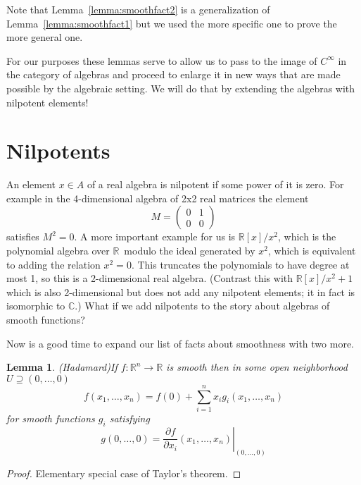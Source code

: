 \documentclass[12pt]{article}
\newcommand{\rr}{\ensuremath{\mathbb{R}}}
\newcommand{\cc}{\ensuremath{\mathbb{C}}}
\newcommand{\cinfty}{\ensuremath{C^{\infty}}}
\newtheorem{mylemma}{Lemma}
\begin{document}
Note that Lemma~\ref{lemma:smoothfact2} is a generalization of Lemma~\ref{lemma:smoothfact1} but we used the more specific one to prove the more general one.

For our purposes these lemmas serve to allow us to pass to the image of $\cinfty$ in the category of algebras and proceed to enlarge it in new ways that are made possible by the algebraic setting. We will do that by extending the algebras with nilpotent elements!

\section{Nilpotents}\label{sec:nilpotents}

An element $x\in A$ of a real algebra is nilpotent if some power of it is zero. For example in the 4-dimensional algebra of 2x2 real matrices the element
\[
  M=\begin{pmatrix}
    0 & 1 \\
    0 & 0
  \end{pmatrix}
\]
satisfies $M^2=0$. A more important example for us is $\rr[x]/x^2$, which is the polynomial algebra over \rr\ modulo the ideal generated by $x^2$, which is equivalent to adding the relation $x^2=0$. This truncates the polynomials to have degree at most 1, so this is a 2-dimensional real algebra. (Contrast this with $\rr[x]/x^2+1$ which is also 2-dimensional but does not add any nilpotent elements; it in fact is isomorphic to \cc.) What if we add nilpotents to the story about algebras of smooth functions?

Now is a good time to expand our list of facts about smoothness with two more.

\begin{mylemma}(Hadamard)\label{lemma:hadamard} If $f:\rr^n\to\rr$ is smooth then in some open neighborhood $U\supseteq (0,\ldots,0)$
\[f(x_1,\ldots,x_n) = f(0) + \sum_{i=1}^n x_i g_i(x_1,\ldots,x_n)\]
for smooth functions $g_i$ satisfying
\[g(0,\ldots,0) = \left.\frac{\partial f}{\partial x_i}(x_1,\ldots,x_n)\right|_{(0,\ldots,0)}\]
\end{mylemma}
\begin{proof}Elementary special case of Taylor's theorem.\end{proof}
\end{document}
